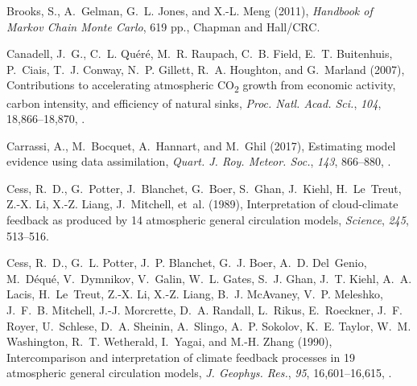 \documentclass[draft]{agujournal}
\begin{document}
\begin{thebibliography}{196}
Brooks, S., A.~Gelman, G.~L. Jones, and X.-L. Meng (2011), \textit{Handbook of
  {M}arkov {C}hain {M}onte {C}arlo}, 619 pp., Chapman and Hall/CRC.

Canadell, J.~G., C.~L. Qu{\'e}r{\'e}, M.~R. Raupach, C.~B. Field, E.~T.
  Buitenhuis, P.~Ciais, T.~J. Conway, N.~P. Gillett, R.~A. Houghton, and
  G.~Marland (2007), Contributions to accelerating atmospheric
  {CO\textsubscript{2}} growth from economic activity, carbon intensity, and
  efficiency of natural sinks, \textit{Proc. Natl. Acad. Sci.}, \textit{104},
  18,866--18,870, .

Carrassi, A., M.~Bocquet, A.~Hannart, and M.~Ghil (2017), Estimating model
  evidence using data assimilation, \textit{Quart. J. Roy. Meteor. Soc.},
  \textit{143}, 866--880, .

Cess, R.~D., G.~Potter, J.~Blanchet, G.~Boer, S.~Ghan, J.~Kiehl, H.~Le~Treut,
  Z.-X. Li, X.-Z. Liang, J.~Mitchell, et~al. (1989), Interpretation of
  cloud-climate feedback as produced by 14 atmospheric general circulation
  models, \textit{Science}, \textit{245}, 513--516.

Cess, R.~D., G.~L. Potter, J.~P. Blanchet, G.~J. Boer, A.~D. Del~Genio,
  M.~D{\'e}qu{\'e}, V.~Dymnikov, V.~Galin, W.~L. Gates, S.~J. Ghan, J.~T.
  Kiehl, A.~A. Lacis, H.~Le~Treut, Z.-X. Li, X.-Z. Liang, B.~J. McAvaney, V.~P.
  Meleshko, J.~F.~B. Mitchell, J.-J. Morcrette, D.~A. Randall, L.~Rikus,
  E.~Roeckner, J.~F. Royer, U.~Schlese, D.~A. Sheinin, A.~Slingo, A.~P.
  Sokolov, K.~E. Taylor, W.~M. Washington, R.~T. Wetherald, I.~Yagai, and M.-H.
  Zhang (1990), Intercomparison and interpretation of climate feedback
  processes in 19 atmospheric general circulation models, \textit{J. Geophys.
  Res.}, \textit{95}, 16,601--16,615, .


\end{thebibliography}
\end{document}
